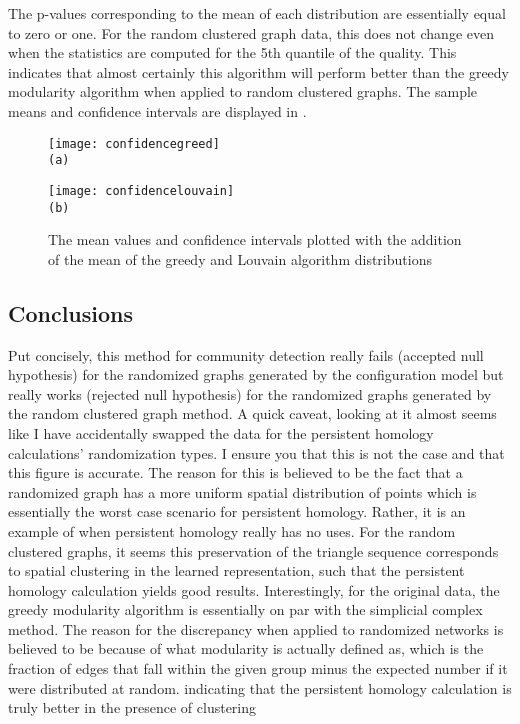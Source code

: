 \documentclass[letter,10pt,openany]{article}
\begin{document}
The p-values corresponding to the mean of each distribution are essentially equal to zero or one.
For the random clustered graph data, this does not change even when the statistics are computed
for the 5th quantile of the quality. This indicates that almost certainly this algorithm will
perform better than the greedy modularity algorithm when applied to random clustered graphs.
The sample means and confidence intervals are displayed in .
\begin{figure}[H]
\begin{minipage}[height=.7\textheight]{.5\textwidth}
\centering
\texttt{[image: confidencegreed]}
\\ \small{\texttt{(a)}}
\end{minipage}
\begin{minipage}[height=.7\textheight]{.5\textwidth}
\centering
\texttt{[image: confidencelouvain]}
\\ \small{\texttt{(b)}}
\end{minipage}
\caption{\label{confidence}
The mean values and confidence intervals plotted with the addition of the
mean of the greedy and Louvain algorithm distributions
}
\end{figure}
\subsection{Conclusions}
Put concisely, this method for community detection really fails (accepted null hypothesis)
for  the randomized graphs generated by the configuration model but really works (rejected
null hypothesis) for the
randomized graphs generated by the random clustered graph method.
A quick caveat, looking at  it almost seems like I have accidentally swapped
the data for the persistent homology calculations' randomization types. I ensure you that
this is not the case and that this figure is accurate.
The reason
for this is believed to be the fact that a randomized graph has a more uniform spatial
distribution of points which is essentially the worst case scenario for persistent homology.
Rather, it is an example of when persistent homology really has no uses.
For the random clustered graphs, it seems this preservation of the triangle sequence corresponds
to spatial clustering in the learned representation, such that the persistent homology
calculation yields good results. Interestingly, for the original data, the greedy modularity
algorithm is essentially on par with the simplicial complex method. The reason
for the discrepancy when applied to randomized networks is believed to be because of what modularity
is actually defined as, which is the fraction of edges that fall within the given group
minus the expected number if it were distributed at random. indicating that the
persistent homology calculation is truly better in the presence of clustering
\end{document}
